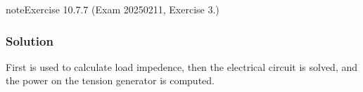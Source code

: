 \documentclass[letterpaper,10pt,italian]{jupyterBook}
\begin{document}
\begin{sphinxadmonition}{note}{Exercise 10.7.7 (Exam 2025\sphinxhyphen{}02\sphinxhyphen{}11, Exercise 3.)}



\begin{figure}[htbp]
\centering

\noindent{}
\end{figure}
\subsubsection*{Solution}

\sphinxAtStartPar
First {\hyperref[\detokenize{ch/electrical-engineering-networks-harmonic:classical-electromagnetism-electrical-engineering-newtork-analysis-harmonic-power}]{}} is used to calculate load impedence, then the electrical circuit is solved, and the power on the tension generator is computed.


\end{sphinxadmonition}
\end{document}
